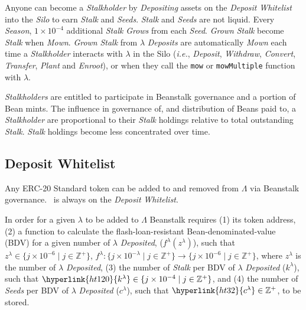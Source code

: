 \documentclass[tikz]{article}
\newcommand{\code}[1]{\texttt{#1}}
\newcommand{\term}[1]{\textsl{#1}}
\newcommand{\Bean}{} %
\begin{document}
Anyone can become a \term{Stalkholder} by \term{Depositing} assets on the \term{Deposit} \term{Whitelist} into the \term{Silo} to earn \term{Stalk} and \term{Seeds}. \term{Stalk} and \term{Seeds} are not liquid. Every \term{Season}, $1 \times 10^{-4}$ additional \term{Stalk} \term{Grows} from each \term{Seed}. \term{Grown} \term{Stalk} become \term{Stalk} when \term{Mown}. \term{Grown} \term{Stalk} from \hyperlink{ht126}{$\lambda$} \term{Deposits} are automatically \term{Mown} each time a \term{Stalkholder} interacts with \hyperlink{ht126}{$\lambda$} in the Silo (\term{i.e.}, \term{Deposit}, \term{Withdraw}, \term{Convert}, \term{Transfer}, \term{Plant} and \term{Enroot}), or when they call the \code{mow} or \code{mowMultiple} function with \hyperlink{ht126}{$\lambda$}.

\term{Stalkholders} are entitled to participate in Beanstalk governance and a portion of Bean mints. The influence in governance of, and distribution of Beans paid to, a \term{Stalkholder} are proportional to their \term{Stalk} holdings relative to total outstanding \term{Stalk}. \term{Stalk} holdings become less concentrated over time.


\vspace*{-1.3mm}
\subsection{Deposit Whitelist}
\vspace*{-1.3mm}

Any ERC-20 Standard token can be added to and removed from \hyperlink{ht127}{$\Lambda$} via Beanstalk governance. \Bean\ is always on the \term{Deposit} \term{Whitelist}.

In order for a given \hyperlink{ht126}{$\lambda$} to be added to \hyperlink{ht127}{$\Lambda$} Beanstalk requires (1) its token address, (2) a function to calculate the flash-loan-resistant Bean-denominated-value (BDV) for a given number of \hyperlink{ht126}{$\lambda$} \term{Deposited}, (\hyperlink{ht84}{$f^{\lambda}(z^{\lambda})$}), such that $z^{\lambda} \in \{j \times 10^{-6} \mid j \in \mathbb{Z}^{+} \}$, $f^{\lambda}\colon \{j \times 10^{-\lambda} \mid j \in \mathbb{Z}^{+} \} \rightarrow \{j \times 10^{-6} \mid j \in \mathbb{Z}^{+} \}$, where $z^{\lambda}$ is the number of \hyperlink{ht126}{$\lambda$} \term{Deposited}, (3) the number of \term{Stalk} per BDV of \hyperlink{ht126}{$\lambda$} \term{Deposited} (\hyperlink{ht120}{$k^{\lambda}$}), such that $\hyperlink{ht120}{k^{\lambda}} \in \{j \times 10^{-4} \mid j \in \mathbb{Z}^{+} \}$, and (4) the number of \term{Seeds} per BDV of \hyperlink{ht126}{$\lambda$} \term{Deposited} (\hyperlink{ht32}{$c^{\lambda}$}), such that $\hyperlink{ht32}{c^{\lambda}} \in \mathbb{Z}^{+}$, to be stored.
\end{document}
